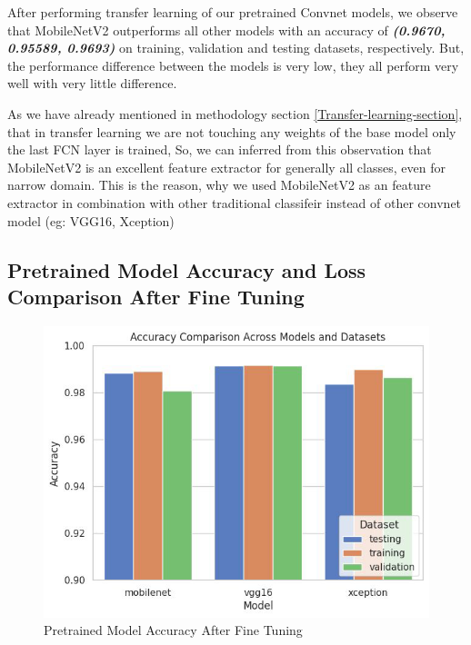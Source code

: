 After performing transfer learning of our pretrained Convnet models, we observe that MobileNetV2 outperforms all other models with an accuracy of\textbf{\textit{ (0.9670, 0.95589, 0.9693)}} on training, validation and testing datasets, respectively. But, the performance difference between the models is very low, they all perform very well with very little difference. \par\vspace{1em}
As we have already mentioned in methodology section \ref{Transfer-learning-section}, that in transfer learning we are not touching any weights of the base model only the last FCN layer is trained, So, we can inferred from this observation that MobileNetV2 is an excellent feature extractor for generally all classes, even for narrow domain. This is the reason, why we used MobileNetV2 as an feature extractor in combination with other traditional classifeir instead of other convnet model (eg: VGG16, Xception) 
\par\vspace{1em}



\subsection{Pretrained Model Accuracy and Loss Comparison After Fine Tuning}
\begin{figure}
    \centering
    \includegraphics[width=0.75\linewidth]{graphics//chapter6/pretrained acc after fine tuning.png}
    \caption{Pretrained Model Accuracy After Fine Tuning}
    \label{fig:acc-ft}
\end{figure}

